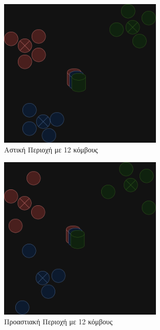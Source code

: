 \begin{figure}[H]
    \centering
    \includegraphics[width=0.7\textwidth]{figures/chapter2/urban.drawio.png}
    \caption{Αστική Περιοχή με 12 κόμβους}
    \label{fig47}
\end{figure}

\begin{figure}[H]
    \centering
    \includegraphics[width=0.7\textwidth]{figures/chapter2/suburban.drawio.png}
    \caption{Προαστιακή Περιοχή με 12 κόμβους}
    \label{fig48}
\end{figure}

\newpage

